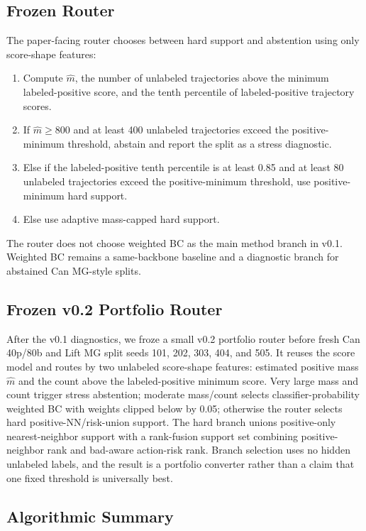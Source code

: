 \documentclass{article}
\begin{document}
\subsection{Frozen Router}

The paper-facing router chooses between hard support and abstention using only score-shape features:
\begin{enumerate}[leftmargin=*]
  \item Compute $\hat{m}$, the number of unlabeled trajectories above the minimum labeled-positive score, and the tenth percentile of labeled-positive trajectory scores.
  \item If $\hat{m}\ge 800$ and at least 400 unlabeled trajectories exceed the positive-minimum threshold, abstain and report the split as a stress diagnostic.
  \item Else if the labeled-positive tenth percentile is at least 0.85 and at least 80 unlabeled trajectories exceed the positive-minimum threshold, use positive-minimum hard support.
  \item Else use adaptive mass-capped hard support.
\end{enumerate}
The router does not choose weighted BC as the main method branch in v0.1. Weighted BC remains a same-backbone baseline and a diagnostic branch for abstained Can MG-style splits.

\subsection{Frozen v0.2 Portfolio Router}

After the v0.1 diagnostics, we froze a small v0.2 portfolio router before fresh Can 40p/80b and Lift MG split seeds 101, 202, 303, 404, and 505. It reuses the score model and routes by two unlabeled score-shape features: estimated positive mass $\hat{m}$ and the count above the labeled-positive minimum score. Very large mass and count trigger stress abstention; moderate mass/count selects classifier-probability weighted BC with weights clipped below by 0.05; otherwise the router selects hard positive-NN/risk-union support. The hard branch unions positive-only nearest-neighbor support with a rank-fusion support set combining positive-neighbor rank and bad-aware action-risk rank. Branch selection uses no hidden unlabeled labels, and the result is a portfolio converter rather than a claim that one fixed threshold is universally best.

\subsection{Algorithmic Summary}
\end{document}
